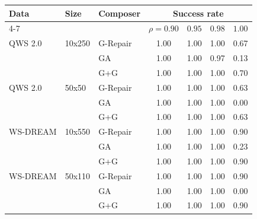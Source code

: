 \begin{tabular}{lllcccc}
\toprule
Data & Size & Composer & \multicolumn{4}{c}{Success rate} \\
\cmidrule(lr){4-7}
 & & & $\rho=0.90$ & $0.95$ & $0.98$ & $1.00$ \\
\midrule
QWS 2.0 & 10x250 & G-Repair & 1.00 & 1.00 & 1.00 & 0.67 \\
 &  & GA & 1.00 & 1.00 & 0.97 & 0.13 \\
 &  & G+G & 1.00 & 1.00 & 1.00 & 0.70 \\
QWS 2.0 & 50x50 & G-Repair & 1.00 & 1.00 & 1.00 & 0.63 \\
 &  & GA & 1.00 & 1.00 & 1.00 & 0.00 \\
 &  & G+G & 1.00 & 1.00 & 1.00 & 0.63 \\
\midrule
WS-DREAM & 10x550 & G-Repair & 1.00 & 1.00 & 1.00 & 0.90 \\
 &  & GA & 1.00 & 1.00 & 1.00 & 0.23 \\
 &  & G+G & 1.00 & 1.00 & 1.00 & 0.90 \\
WS-DREAM & 50x110 & G-Repair & 1.00 & 1.00 & 1.00 & 0.90 \\
 &  & GA & 1.00 & 1.00 & 1.00 & 0.00 \\
 &  & G+G & 1.00 & 1.00 & 1.00 & 0.90 \\
\bottomrule
\end{tabular}
